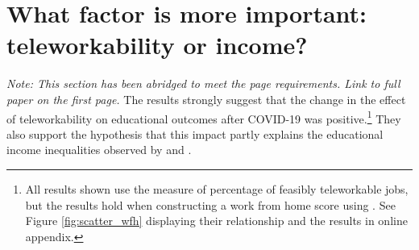 \section{What factor is more important: teleworkability or income?} \label{sec:result}
\if{}
{\small
    \textit{Note: This section has been abridged to meet the page requirements. Link to full paper on the first page.}
}
\fi
The results strongly suggest that the change in the effect of teleworkability on
educational outcomes after COVID-19 was positive.\footnote{All results shown use the \cite{dingel} measure of percentage of feasibly teleworkable jobs, but the results hold when constructing a work from home score using \cite{mongey}. See Figure \ref{fig:scatter_wfh} displaying their relationship and the \cite{mongey} results in online appendix.}
They also support the hypothesis that this impact partly explains the educational income inequalities
observed by \cite{bh1} and \cite{chetty}.

